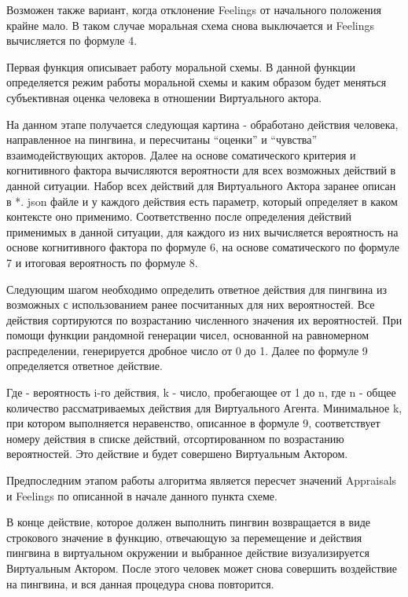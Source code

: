 Возможен также вариант, когда отклонение Feelings от начального положения крайне мало. В таком случае моральная схема снова выключается и Feelings вычисляется по формуле 4. 

Первая функция описывает работу моральной схемы. В данной функции определяется режим работы моральной схемы и каким образом будет меняться субъективная оценка человека в отношении Виртуального актора.

На данном этапе получается следующая картина - обработано действия человека, направленное на пингвина, и пересчитаны “оценки” и “чувства” взаимодействующих акторов. Далее на основе соматического критерия и когнитивного фактора вычисляются вероятности для всех возможных действий в данной ситуации. Набор всех действий для Виртуального Актора заранее описан в *. json файле и у каждого действия есть параметр, который определяет в каком контексте оно применимо. Соответственно после определения действий применимых в данной ситуации, для каждого из них вычисляется вероятность на основе когнитивного фактора по формуле 6, на основе соматического по формуле 7 и итоговая вероятность по формуле 8. 

Следующим шагом необходимо определить ответное действия для пингвина из возможных с использованием ранее посчитанных для них вероятностей. Все действия сортируются по возрастанию численного значения их вероятностей. При помощи функции рандомной генерации чисел, основанной на равномерном распределении, генерируется дробное число от 0 до 1. Далее по формуле 9 определяется ответное действие.

Где  - вероятность i-го действия, k - число, пробегающее от 1 до n, где n - общее количество рассматриваемых действия для Виртуального Агента. Минимальное k, при котором выполняется неравенство, описанное в формуле 9, соответствует номеру действия в списке действий, отсортированном по возрастанию вероятностей. Это действие и будет совершено Виртуальным Актором.

Предпоследним этапом работы алгоритма является пересчет значений Appraisals и Feelings по описанной в начале данного пункта схеме.

В конце действие, которое должен выполнить пингвин возвращается в виде строкового значение в функцию, отвечающую за перемещение и действия пингвина в виртуальном окружении и выбранное действие визуализируется Виртуальным Актором. После этого человек может снова совершить воздействие на пингвина, и вся данная процедура снова повторится. 

